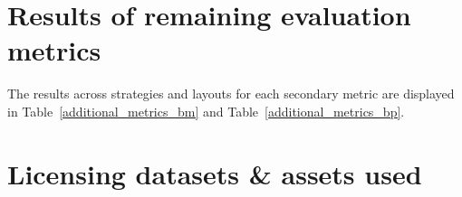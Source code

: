 \documentclass{article}
\begin{document}






\section{Results of remaining evaluation metrics}\label{appendix:evaluation metrics results}
The results across strategies and layouts for each secondary metric are displayed in Table~\ref{additional_metrics_bm} and Table~\ref{additional_metrics_bp}.



\section{Licensing datasets \& assets used}
\end{document}
